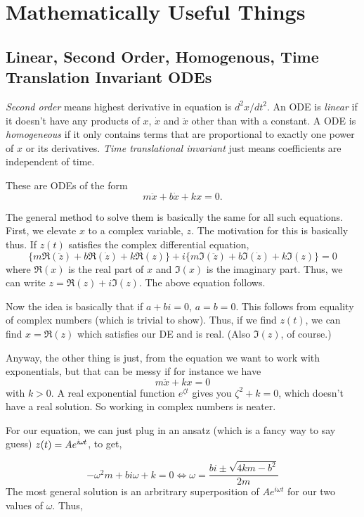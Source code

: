 \setlength{\chnumsep}{8em}
\chapter{Mathematically Useful Things}

\section{Linear, Second Order, Homogenous, Time Translation Invariant ODEs}

\textit{Second order} means highest derivative in equation is ${d^2x}/{dt^2}$. An ODE is \textit{linear} if it doesn’t have any products of $x$, $\dot{x}$ and $\ddot{x}$ other than with a constant.
A ODE is \textit{homogeneous} if it only contains terms that are proportional to exactly one power of $x$ or its derivatives.
\textit{Time translational invariant} just means coefficients are independent of time.


These are ODEs of the form 
$$m \ddot{x} + b \dot{x} + kx = 0.$$

The general method to solve them is basically the same for all such equations. 
First, we elevate $x$ to a complex variable, $z$. 
The motivation for this is basically thus. If $z(t)$ satisfies the complex differential equation,
$$
\{m\Re(\ddot{z}) + b\Re(\dot{z}) + k\Re(z)\} + i\{m\Im(\ddot{z}) + b\Im(\dot{z}) + k\Im(z)\} = 0
$$
where $\Re(x)$ is the real part of $x$ and $\Im(x)$ is the imaginary part. Thus, we can write $z = \Re(z) + i\Im(z)$. The above equation follows. 

Now the idea is basically that if $a + bi = 0$, $a = b = 0$. 
This follows from equality of complex numbers (which is trivial to show). Thus, if we find $z(t)$, we can find $x = \Re(z)$ which satisfies our DE and is real. 
(Also $\Im(z)$, of course.) 

Anyway, the other thing is just, from the equation we want to work with exponentials, but that can be messy if for instance we have $$m \ddot{x} + kx = 0$$ with $k > 0$. A real exponential function $e^{\zeta t}$ gives you $\zeta^2 + k = 0$, which doesn’t have a real solution. So working in complex numbers is neater.

For our equation, we can just plug in an ansatz (which is a fancy way to say guess) $z(t) = Ae^{i\hspace{-0.05em}\omega\hspace{-0.05em} t}$, to get,

$$
-\omega^2 m + bi\omega + k = 0 \iff \omega = \frac{{bi \pm \sqrt{ 4km - b^2}}}{2m}
$$
The most general solution is an arbritrary superposition of $Ae^{i\omega t}$ for our two values of $\omega$. Thus,

